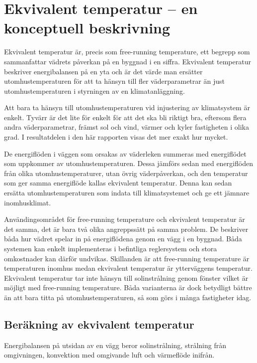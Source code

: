 \section{Ekvivalent temperatur  – en konceptuell beskrivning}
\label{sec:ekv_temp}

Ekvivalent temperatur är, precis som free-running temperature, ett begrepp som sammanfattar vädrets påverkan på en byggnad i en siffra. Ekvivalent temperatur beskriver energibalansen på en yta och är det värde man ersätter utomhustemperaturen för att ta 
hänsyn till fler väderparametrar än just utomhustemperaturen i styrningen av en 
klimatanläggning.

Att bara ta hänsyn till utomhustemperaturen vid injustering av klimatsystem är enkelt. 
Tyvärr är det lite för enkelt för att det ska bli riktigt bra, eftersom flera andra 
väderparametrar, främst sol och vind, värmer och kyler fastigheten i olika grad. I resultatdelen i den här rapporten visas det mer exakt hur mycket.

De energiflöden i väggen som orsakas av väderleken summeras med energiflödet 
som uppkommer av utomhustemperaturen. Dessa jämförs sedan med energiflöden från 
olika utomhustemperaturer, utan övrig väderpåverkan, och den temperatur som ger 
samma energiflöde kallas ekvivalent temperatur. Denna kan sedan ersätta 
utomhustemperaturen som indata till klimatsystemet och ge ett jämnare inomhusklimat. 

Användingsområdet för free-running temperature och ekvivalent temperatur är det samma, det är bara två olika angreppssätt på samma problem. De beskriver båda hur vädret spelar in på energiflödena genom en vägg i en byggnad.  Båda systemen kan enkelt implementeras i befintliga reglersystem och stora omkostnader kan därför undvikas. Skillanden är att free-running temperature är temperaturen inomhus medan ekvivalent temperatur är ytterväggens temperatur. Ekvivalent temperatur tar inte hänsyn till solinstrålning genom fönster vilket är möjligt med free-running temperature. Båda varianterna är dock betydligt bättre än att bara titta på utomhustemperaturen, så som görs i många fastigheter idag.

\subsection{Beräkning av ekvivalent temperatur}

Energibalansen på utsidan av en vägg beror solinstrålning, strålning från omgivningen, konvektion med omgivande luft och värmeflöde inifrån.

